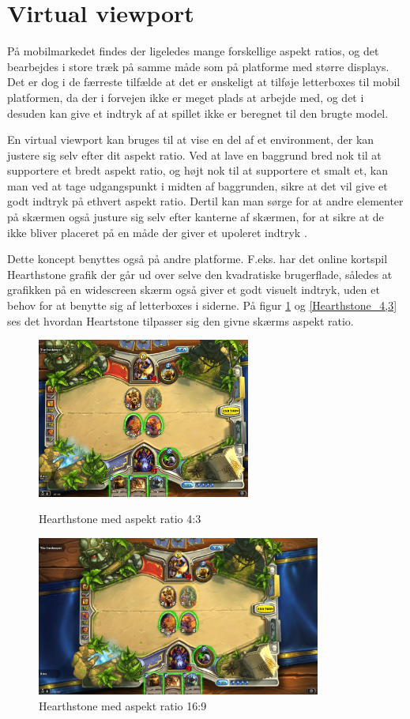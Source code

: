 \documentclass[Main.tex]{AspectRatio.tex}
\begin{document}
\section{Virtual viewport}

På mobilmarkedet findes der ligeledes mange forskellige aspekt ratios, og det bearbejdes i store træk på samme måde som på platforme med større displays. Det er dog i de færreste tilfælde at det er ønskeligt at tilføje letterboxes til mobil platformen, da der i forvejen ikke er meget plads at arbejde med, og det i desuden kan give et indtryk af at spillet ikke er beregnet til den brugte model.

En virtual viewport kan bruges til at vise en del af et environment, der kan justere sig selv efter dit aspekt ratio. Ved at lave en baggrund bred nok til at supportere et bredt aspekt ratio, og højt nok til at supportere et smalt et, kan man ved at tage udgangspunkt i midten af baggrunden, sikre at det vil give et godt indtryk på ethvert aspekt ratio. Dertil kan man sørge for at andre elementer på skærmen også justure sig selv efter kanterne af skærmen, for at sikre at de ikke bliver placeret på en måde der giver et upoleret indtryk \cite{gemserk}.

Dette koncept benyttes også på andre platforme. F.eks. har det online kortspil Hearthstone grafik der går ud over selve den kvadratiske brugerflade, således at grafikken på en widescreen skærm også giver et godt visuelt indtryk, uden et behov for at benytte sig af letterboxes i siderne. På figur \ref{Hearthstone_16,9} og \ref{Hearthstone_4,3} ses det hvordan Heartstone tilpasser sig den givne skærms aspekt ratio.
 
\begin{figure}[h]
\centering
\parbox{7cm}{
\includegraphics[width = 7cm]{billeder/Heathstone_4,3}
\caption{Hearthstone med aspekt ratio 4:3}
\label{Hearthstone_4,3}}
\qquad
\begin{minipage}{9.33cm}
\includegraphics[width = 9.33cm]{billeder/Heathstone_16,9}
\caption{Hearthstone med aspekt ratio 16:9}
\label{Hearthstone_16,9}
\end{minipage}
\end{figure}
\end{document}

